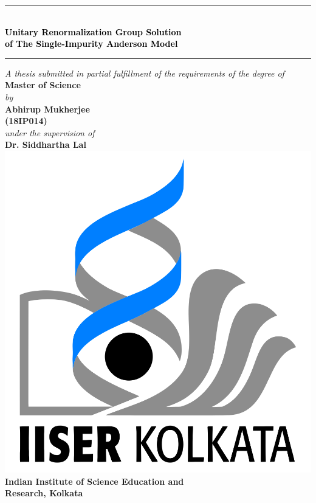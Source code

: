 \documentclass[12pt,twoside]{report}
\numberwithin{equation}{section}
\begin{document}
\begin{titlepage}
	\centering
	\rule{\textwidth}{3pt}\\
	\vspace*{25pt}
	\textcolor{black}{ %
		\textbf{\LARGE Unitary Renormalization Group Solution}\\[10pt]
		\textbf{\LARGE of The Single-Impurity Anderson Model}
	\vspace*{25pt}
	}
	\rule{\textwidth}{3pt} %
	\vfill
{
	\textit{\large A thesis submitted in partial fulfillment of the requirements of the degree of }\\
	\vspace*{15pt}
	{\Large \textbf{Master of Science\\}}
	\vspace*{15pt}
	\textit{\large by \\}
	\vspace*{15pt}
	{\Large \textbf{Abhirup Mukherjee \\}}
	\vspace*{5pt}
	{\Large \textbf{(18IP014)\\}}
	\vspace*{15pt}
	\textit{\large under the supervision of \\}
	\vspace*{15pt}
	{\Large \textbf{Dr. Siddhartha Lal}}
}
	\vfill
	\includegraphics[scale=0.15]{../logo.png}\\
	\vspace{0.01\textheight}
	\textbf{\Large Indian Institute of Science Education and \\[10pt]}
\textbf{\Large Research, Kolkata}
\end{titlepage}
\end{document}
